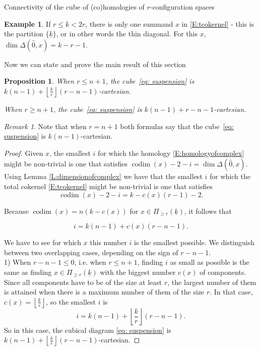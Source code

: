 \documentclass[12pt]{amsart}
\newcommand{\codim}{\operatorname{codim}}
\theoremstyle{plain}
\newtheorem{prop}[thm]{Proposition}
\theoremstyle{definition}
\newtheorem{example}[thm]{Example}
\theoremstyle{remark}
\newtheorem{rem}[thm]{Remark}
\begin{document}
\begin{section}{Connectivity of the cube of (co)homologies of $r$-configuration spaces}
\begin{example}
If $r \leq k <2r$, there is only one summand $x$ in \eqref{E:tcokernel} - this is the partition $\{\underline{k}\}$, or in other words the thin diagonal. For this $x$, $\dim \Delta (\hat{0},x)=k-r-1$. 
\end{example}
Now we can state and prove the main result of this section
\begin{prop}\label{prop: conf connectivity}
When $r\le n+1$, the cube~\eqref{eq: suspension} is $k(n-1)+\left\lfloor \frac{k}{r}\right\rfloor (r-n-1)$-cartesian.

When $r\ge n+1$, the cube~\eqref{eq: suspension} is $k(n-1)+r-n-1$-cartesian.
\end{prop}
\begin{rem}\label{remark: borderline}
Note that when $r=n+1$ both formulas say that the cube~\eqref{eq: suspension} is $k(n-1)$-cartesian.
\end{rem}
\begin{proof}
Given $x$, the smallest $i$ for which the homology \eqref{E:homologyofcomplex} might be non-trivial is one that satisfies $\codim(x)-2-i=\dim \Delta(\hat{0},x)$. Using Lemma \ref{L:dimensionofcomplex} we have that the smallest $i$ for which the total cokernel \eqref{E:tcokernel} might be non-trivial is one that satisfies
$$
\codim(x)-2-i=k-c(x)(r-1)-2.
$$

Because $\codim(x)=n(k-c(x))$ for $x \in \Pi_{\geq r}(\underline{k})$, it follows that

\begin{equation}\label{E:LowestHomology}
i=k(n-1)+c(x)(r-n-1).
\end{equation}

We have to see for which $x$ this number $i$ is the smallest possible. We distinguish between two overlapping cases, depending on the sign of $r-n-1$.\\

1) When $r-n-1\le 0$, i.e. when $r\le n+1$, finding $i$ as small as possible is the same as finding $x \in \Pi_{\geq r}(\underline{k})$ with the biggest number $c(x)$ of components. Since all components have to be of the size at least $r$, the largest number of them is attained when there is a maximum number of them of the size $r$. In that case, $c(x)=\left\lfloor \frac{k}{r}\right\rfloor$, so the smallest $i$ is $$i=k(n-1)+\left\lfloor \frac{k}{r}\right\rfloor (r-n-1).$$ So in this case, the cubical diagram \eqref{eq: suspension} is $k(n-1)+\left\lfloor \frac{k}{r}\right\rfloor (r-n-1)$-cartesian.


\end{proof}
\end{section}
\end{document}
